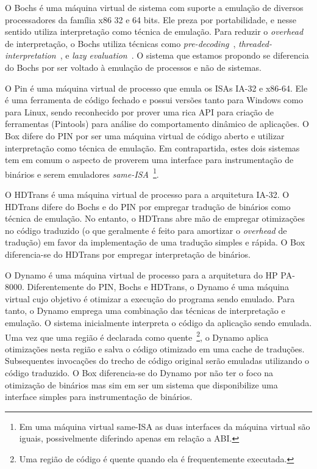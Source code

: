 \documentclass[11pt,twoside]{article}
\begin{document}
O Bochs \cite{bochs} é uma máquina virtual de sistema com suporte a
emulação de diversos processadores da família x86 32 e 64 bits. Ele
preza por portabilidade, e nesse sentido utiliza interpretação como
técnica de emulação. Para reduzir o \textit{overhead} de
interpretação, o Bochs utiliza técnicas como
\emph{pre-decoding}~\cite{Magnusson1994},
\emph{threaded-interpretation}~\cite{Klint1981}, e \emph{lazy
  evaluation}~\cite{Hookway1997}.  O sistema que estamos propondo se
diferencia do Bochs por ser voltado à emulação de processos e não de
sistemas.

O Pin \cite{Luk2005} é uma máquina virtual de processo que emula os
ISAs IA-32 e x86-64. Ele é uma ferramenta de código fechado e possui
versões tanto para Windows como para Linux, sendo reconhecido por
prover uma rica API para criação de ferramentas (Pintools) para
análise do comportamento dinâmico de aplicações. O Box difere do PIN
por ser uma máquina virtual de código aberto e utilizar interpretação
como técnica de emulação. Em contrapartida, estes dois sistemas tem em
comum o aspecto de proverem uma interface para instrumentação de
binários e serem emuladores \emph{same-ISA}~\footnote{Em uma máquina
  virtual same-ISA as duas interfaces da máquina virtual são iguais,
  possivelmente diferindo apenas em relação a ABI.}.

O HDTrans \cite{Sridhar2006} é uma máquina virtual de processo para a
arquitetura IA-32. O HDTrans difere do Bochs e do PIN por empregar
tradução de binários como técnica de emulação. No entanto, o HDTrans
abre mão de empregar otimizações no código traduzido (o que geralmente
é feito para amortizar o \textit{overhead} de tradução) em favor da
implementação de uma tradução simples e rápida. O Box diferencia-se do
HDTrans por empregar interpretação de binários.

O Dynamo \cite{Bala2000} é uma máquina virtual de processo para a
arquitetura do HP PA-8000. Diferentemente do PIN, Bochs e HDTrans, o
Dynamo é uma máquina virtual cujo objetivo é otimizar a execução do
programa sendo emulado. Para tanto, o Dynamo emprega uma combinação
das técnicas de interpretação e emulação. O sistema inicialmente
interpreta o código da aplicação sendo emulada. Uma vez que uma região
é declarada como quente~\footnote{Uma região de código é quente quando
  ela é frequentemente executada.}, o Dynamo aplica otimizações nesta
região e salva o código otimizado em uma cache de
traduções. Subsequentes invocações do trecho de código original serão
emuladas utilizando o código traduzido. O Box diferencia-se do Dynamo
por não ter o foco na otimização de binários mas sim em ser um sistema
que disponibilize uma interface simples para instrumentação de
binários.
\end{document}
